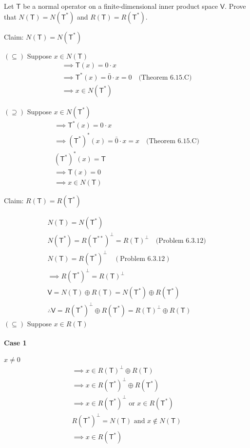 Let $\mathsf{T}$ be a normal operator on a finite-dimensional inner
product space $\mathsf{V}.$ Prove that $N(\mathsf{T}) =
N(\mathsf{T}^*)$ and $R(\mathsf{T}) = R(\mathsf{T}^*).$

Claim:  $N(\mathsf{T}) = N(\mathsf{T}^*)$

$(\subseteq)$ Suppose $x \in N(\mathsf{T})$
\begin{gather}
\implies \mathsf{T}(x) = 0\cdot x\\
\implies \mathsf{T}^*(x) = \bar{0}\cdot x =0\quad\text{(Theorem 6.15.C)}\\ 
\implies x \in N(\mathsf{T}^*)
\end{gather}

$(\supseteq)$ Suppose $x \in N(\mathsf{T}^*)$
\begin{gather}
\implies \mathsf{T}^*(x) = 0 \cdot x\\
\implies \left(\mathsf{T}^*\right)^*(x) = \bar{0}\cdot x = x \quad\text{(Theorem 6.15.C)}\\
\left(\mathsf{T}^*\right)^*(x) = \mathsf{T}\\
\implies \mathsf{T}(x) = 0\\
\implies x \in N(\mathsf{T})
\end{gather}

Claim: $R(\mathsf{T}) = R(\mathsf{T}^*)$

\begin{gather}
N(\mathsf{T}) = N(\mathsf{T}^*)\\
N(\mathsf{T}^*) = R(\mathsf{T}^{**})^\perp = R(\mathsf{T})^\perp
\quad \text{(Problem 6.3.12)}\\
N(\mathsf{T}) = R(\mathsf{T}^*)^\perp \quad (\text{Problem 6.3.12})\\
\implies R(\mathsf{T}^*)^\perp = R(\mathsf{T})^\perp\\
\mathsf{V} =N(\mathsf{T})\oplus R(\mathsf{T}) = N(\mathsf{T}^*) \oplus R(\mathsf{T}^*)\\
\therefore \mathsf{V} = R(\mathsf{T}^*)^\perp \oplus R(\mathsf{T}^*) =
R(\mathsf{T})^\perp \oplus R(\mathsf{T})
\end{gather}
\newpage{}
$(\subseteq)$ Suppose $x \in R(\mathsf{T})$
\paragraph{Case 1} $x \neq 0$
\begin{gather}
\implies x \in R(\mathsf{T})^\perp \oplus R(\mathsf{T})\\
\implies x \in R(\mathsf{T}^*)^\perp \oplus R(\mathsf{T}^*)\\
\implies x \in R(\mathsf{T}^*)^\perp \text{ or } x \in
R(\mathsf{T}^*)\\
R(\mathsf{T}^*)^\perp = N(\mathsf{T}) \text{ and } x \notin N(\mathsf{T})\\
\implies x \in R(\mathsf{T}^*)
\end{gather}
